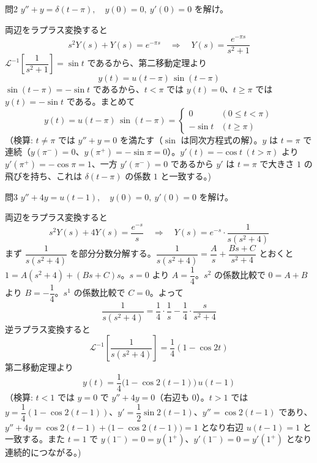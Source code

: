 \documentclass[a4paper,11pt]{article}
\begin{document}
\clearpage
\begin{mondaiboxS}{問2}
$y'' + y = \delta(t-\pi), \quad y(0) = 0,\ y'(0) = 0$ を解け。
\end{mondaiboxS}
\kaitou
両辺をラプラス変換すると
\[
s^{2}Y(s) + Y(s) = e^{-\pi s}
\quad\Longrightarrow\quad
Y(s) = \frac{e^{-\pi s}}{s^{2}+1}
\]
$\mathcal{L}^{-1}\!\left[\dfrac{1}{s^{2}+1}\right] = \sin t$ であるから、第二移動定理より
\[
y(t) = u(t-\pi)\,\sin(t-\pi)
\]
$\sin(t-\pi) = -\sin t$ であるから、$t<\pi$ では $y(t)=0$、$t \ge \pi$ では $y(t) = -\sin t$ である。まとめて
\[
\boxed{\; y(t) = u(t-\pi)\,\sin(t-\pi) =
\begin{cases}
0 & (0 \le t < \pi) \\
-\sin t & (t \ge \pi)
\end{cases} \;}
\]
（検算: $t \ne \pi$ では $y''+y=0$ を満たす（$\sin$ は同次方程式の解）。$y$ は $t=\pi$ で連続（$y(\pi^{-})=0$、$y(\pi^{+})=-\sin\pi=0$）。$y'(t) = -\cos t\ (t>\pi)$ より $y'(\pi^{+})=-\cos\pi=1$、一方 $y'(\pi^{-})=0$ であるから $y'$ は $t=\pi$ で大きさ $1$ の飛びを持ち、これは $\delta(t-\pi)$ の係数 $1$ と一致する。)

\clearpage
\begin{mondaiboxS}{問3}
$y'' + 4y = u(t-1), \quad y(0) = 0,\ y'(0) = 0$ を解け。
\end{mondaiboxS}
\kaitou
両辺をラプラス変換すると
\[
s^{2}Y(s) + 4Y(s) = \frac{e^{-s}}{s}
\quad\Longrightarrow\quad
Y(s) = e^{-s}\cdot\frac{1}{s(s^{2}+4)}
\]
まず $\dfrac{1}{s(s^{2}+4)}$ を部分分数分解する。$\dfrac{1}{s(s^{2}+4)} = \dfrac{A}{s} + \dfrac{Bs+C}{s^{2}+4}$ とおくと
$1 = A(s^{2}+4) + (Bs+C)s$。$s=0$ より $A = \dfrac{1}{4}$。$s^{2}$ の係数比較で $0 = A+B$ より $B=-\dfrac{1}{4}$。$s^{1}$ の係数比較で $C=0$。よって
\[
\frac{1}{s(s^{2}+4)} = \frac{1}{4}\cdot\frac{1}{s} - \frac{1}{4}\cdot\frac{s}{s^{2}+4}
\]
逆ラプラス変換すると
\[
\mathcal{L}^{-1}\!\left[\frac{1}{s(s^{2}+4)}\right] = \frac{1}{4}\left(1 - \cos 2t\right)
\]
第二移動定理より
\[
\boxed{\; y(t) = \frac{1}{4}\bigl(1 - \cos 2(t-1)\bigr)\,u(t-1) \;}
\]
（検算: $t<1$ では $y=0$ で $y''+4y=0$（右辺も $0$）。$t>1$ では $y = \dfrac{1}{4}(1-\cos 2(t-1))$、$y' = \dfrac{1}{2}\sin 2(t-1)$、$y'' = \cos 2(t-1)$ であり、
$y''+4y = \cos 2(t-1) + \bigl(1-\cos 2(t-1)\bigr) = 1$
となり右辺 $u(t-1)=1$ と一致する。また $t=1$ で $y(1^{-})=0=y(1^{+})$、$y'(1^{-})=0=y'(1^{+})$ となり連続的につながる。)
\end{document}

